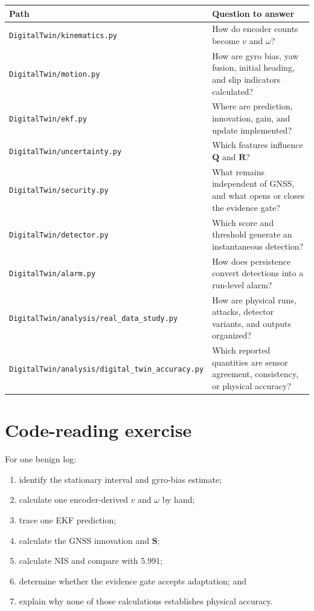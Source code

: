 \documentclass[11pt,oneside]{book}
\newcommand{\vect}[1]{\bm{#1}}
\newcommand{\projectpath}[1]{\texttt{#1}}
\begin{document}
\begin{longtable}{p{}p{}}
\toprule
Path & Question to answer\\
\midrule
\endhead
\projectpath{DigitalTwin/kinematics.py} & How do encoder counts become
$v$ and $\omega$?\\
\projectpath{DigitalTwin/motion.py} & How are gyro bias, yaw fusion,
initial heading, and slip indicators calculated?\\
\projectpath{DigitalTwin/ekf.py} & Where are prediction, innovation,
gain, and update implemented?\\
\projectpath{DigitalTwin/uncertainty.py} & Which features influence
$\vect{Q}$ and $\vect{R}$?\\
\projectpath{DigitalTwin/security.py} & What remains independent of GNSS,
and what opens or closes the evidence gate?\\
\projectpath{DigitalTwin/detector.py} & Which score and threshold generate
an instantaneous detection?\\
\projectpath{DigitalTwin/alarm.py} & How does persistence convert detections
into a run-level alarm?\\
\projectpath{DigitalTwin/analysis/real\_data\_study.py} & How are physical
runs, attacks, detector variants, and outputs organized?\\
\projectpath{DigitalTwin/analysis/digital\_twin\_accuracy.py} & Which reported
quantities are sensor agreement, consistency, or physical accuracy?\\
\bottomrule
\end{longtable}

\section{Code-reading exercise}

For one benign log:
\begin{enumerate}
  \item identify the stationary interval and gyro-bias estimate;
  \item calculate one encoder-derived $v$ and $\omega$ by hand;
  \item trace one EKF prediction;
  \item calculate the GNSS innovation and $\vect{S}$;
  \item calculate NIS and compare with 5.991;
  \item determine whether the evidence gate accepts adaptation; and
  \item explain why none of those calculations establishes physical accuracy.
\end{enumerate}
\end{document}
